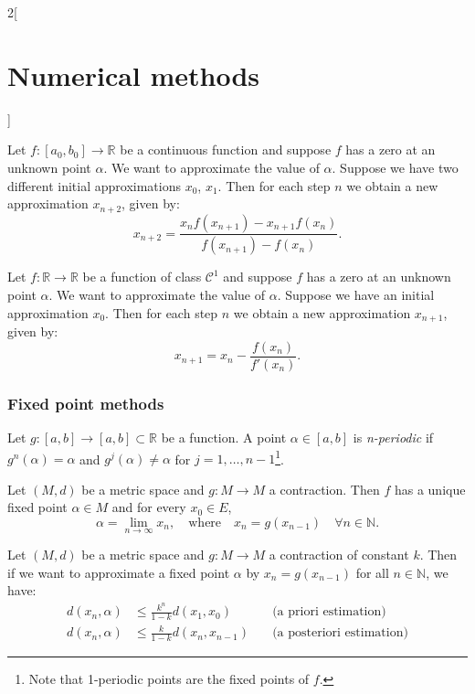 \documentclass[class=article,10pt,crop=false]{standalone}
\begin{document}
\begin{multicols}{2}[\section{Numerical methods}]
\begin{theorem}
\end{theorem}
\begin{theorem}
Let $f:[a_0,b_0]\rightarrow\mathbb{R}$ be a continuous function and suppose $f$ has a zero at an unknown point $\alpha$. We want to approximate the value of $\alpha$. Suppose we have two different initial approximations $x_0$, $x_1$. Then for each step $n$ we obtain a new approximation $x_{n+2}$, given by: $$x_{n+2}=\frac{x_nf(x_{n+1})-x_{n+1}f(x_n)}{f(x_{n+1})-f(x_n)}.$$
\end{theorem}
\begin{theorem}
Let $f:\mathbb{R}\rightarrow\mathbb{R}$ be a function of class $\mathcal{C}^1$ and suppose $f$ has a zero at an unknown point $\alpha$. We want to approximate the value of $\alpha$. Suppose we have an initial approximation $x_0$. Then for each step $n$ we obtain a new approximation $x_{n+1}$, given by: $$x_{n+1}=x_n-\frac{f(x_n)}{f'(x_n)}.$$
\end{theorem}
\subsubsection*{Fixed point methods}
\begin{definition}
Let $g:[a,b]\rightarrow[a,b]\subset\mathbb{R}$ be a function. A point $\alpha\in[a,b]$ is \textit{n-periodic} if $g^n(\alpha)=\alpha$ and $g^j(\alpha)\ne\alpha$ for $j=1,\ldots,n-1$\footnote{Note that 1-periodic points are the fixed points of $f$.}.
\end{definition}
\begin{theorem}
Let $(M,d)$ be a metric space and $g:M\rightarrow M$ a contraction. Then $f$ has a unique fixed point $\alpha\in M$ and for every $x_0\in E$, $$\alpha=\lim_{n\to\infty}x_n,\quad\text{where}\quad x_n=g(x_{n-1})\quad\forall n\in\mathbb{N}.$$
\end{theorem}
\begin{prop}
Let $(M,d)$ be a metric space and $g:M\rightarrow M$ a contraction of constant $k$. Then if we want to approximate a fixed point $\alpha$ by $x_n=g(x_{n-1})$ for all $n\in\mathbb{N}$, we have:
\begin{align*}
    d(x_n,\alpha)&\leq\frac{k^n}{1-k}d(x_1,x_0)\quad&\text{(a priori estimation)}\\
    d(x_n,\alpha)&\leq\frac{k}{1-k}d(x_n,x_{n-1})\quad&\text{(a posteriori estimation)}
\end{align*}
\end{prop}
\end{multicols}
\end{document}
